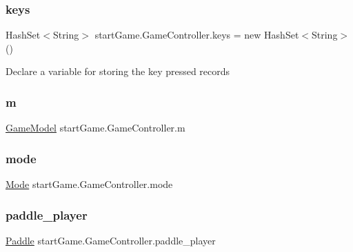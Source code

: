 \subsubsection{\texorpdfstring{keys}{keys}}
{\footnotesize\ttfamily Hash\+Set$<$String$>$ start\+Game.\+Game\+Controller.\+keys = new Hash\+Set$<$String$>$()\hspace{0.3cm}{\ttfamily [private]}}

Declare a variable for storing the key pressed records \hypertarget{classstart_game_1_1_game_controller_a2c79234f85f979b8f1efe5a48893560d}{}\label{classstart_game_1_1_game_controller_a2c79234f85f979b8f1efe5a48893560d} 
\subsubsection{\texorpdfstring{m}{m}}
{\footnotesize\ttfamily \hyperlink{classmodel_1_1_game_model}{Game\+Model} start\+Game.\+Game\+Controller.\+m\hspace{0.3cm}{\ttfamily [private]}}

\hypertarget{classstart_game_1_1_game_controller_ad46f15cbc3846c80495ca340b3b1dedc}{}\label{classstart_game_1_1_game_controller_ad46f15cbc3846c80495ca340b3b1dedc} 
\subsubsection{\texorpdfstring{mode}{mode}}
{\footnotesize\ttfamily \hyperlink{classview_1_1_mode}{Mode} start\+Game.\+Game\+Controller.\+mode\hspace{0.3cm}{\ttfamily [private]}}

\hypertarget{classstart_game_1_1_game_controller_a4dc3f50458dc835c6fa67be53fd1751b}{}\label{classstart_game_1_1_game_controller_a4dc3f50458dc835c6fa67be53fd1751b} 
\subsubsection{\texorpdfstring{paddle\+\_\+player}{paddle\_player}}
{\footnotesize\ttfamily \hyperlink{classmodel_1_1_paddle}{Paddle} start\+Game.\+Game\+Controller.\+paddle\+\_\+player\hspace{0.3cm}{\ttfamily [private]}}

